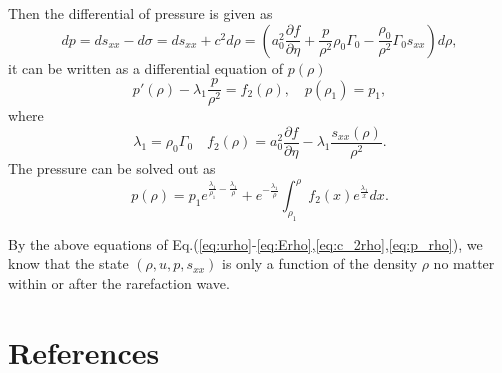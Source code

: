 \documentclass[review]{elsarticle}
\begin{document}
Then the differential of  pressure is  given  as 
\begin{equation}
  dp = ds_{xx} -d\sigma = ds_{xx}+c^2 d\rho = \left( a_0^2 \frac{\partial f}{\partial \eta} + \frac{p}{\rho^2}\rho_0\Gamma_0 -\frac{\rho_0}{\rho^2}\Gamma_0 s_{xx}\right) d\rho,
\end{equation}
it can be written as a differential equation of $p(\rho)$
\begin{equation}
  p'(\rho) - \lambda_1 \frac{p}{\rho^2} = f_2(\rho), \quad p(\rho_1) = p_1,
\end{equation}
where 
\begin{equation}
  \lambda_1 = \rho_0 \Gamma_0 \quad f_2(\rho) = a_0^2\frac{\partial f}{\partial \eta}- \lambda_1\frac{s_{xx}(\rho)}{\rho^2}.
\end{equation}
The pressure can be solved out as
\begin{equation}\label{eq:p_rho}
  p(\rho) = p_1e^{\frac{\lambda_1}{\rho_1}-\frac{\lambda_1}{\rho}} +e^{-\frac{\lambda_1}{\rho}}\int_{\rho_1}^\rho f_2(x) e^{\frac{\lambda_1}{x}}dx.
\end{equation}

By the above equations of Eq.(\ref{eq:urho}-\ref{eq:Erho},\ref{eq:c_2rho},\ref{eq:p_rho}), we know that the state $(\rho, u, p, s_{xx})$ is only  a function of the density $\rho$ no matter within or  after the rarefaction wave.  

\section*{References}



\newpage
  \appendix
  \renewcommand{\appendixname}{Appendix~}
\end{document}
